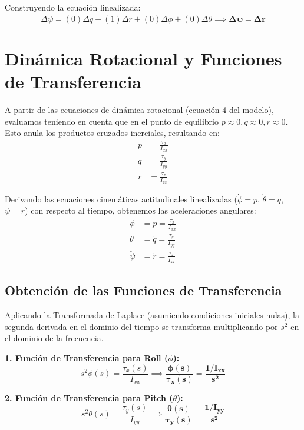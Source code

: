 \documentclass[12pt]{article}
\begin{document}
Construyendo la ecuación linealizada:
\begin{equation}
    \Delta\dot{\psi} = (0)\Delta q + (1)\Delta r + (0)\Delta \phi + (0)\Delta \theta \implies \mathbf{\Delta\dot{\psi} = \Delta r}
\end{equation}

\vspace{0.5cm}

\section{Dinámica Rotacional y Funciones de Transferencia}
A partir de las ecuaciones de dinámica rotacional (ecuación 4 del modelo), evaluamos teniendo en cuenta que en el punto de equilibrio $p \approx 0, q \approx 0, r \approx 0$. Esto anula los productos cruzados inerciales, resultando en:
\begin{align}
    \dot{p} &= \frac{\tau_x}{I_{xx}} \\
    \dot{q} &= \frac{\tau_y}{I_{yy}} \\
    \dot{r} &= \frac{\tau_z}{I_{zz}}
\end{align}

Derivando las ecuaciones cinemáticas actitudinales linealizadas ($\dot{\phi} = p$, $\dot{\theta} = q$, $\dot{\psi} = r$) con respecto al tiempo, obtenemos las aceleraciones angulares:
\begin{align}
    \ddot{\phi} &= \dot{p} = \frac{\tau_x}{I_{xx}} \\
    \ddot{\theta} &= \dot{q} = \frac{\tau_y}{I_{yy}} \\
    \ddot{\psi} &= \dot{r} = \frac{\tau_z}{I_{zz}}
\end{align}

\subsection{Obtención de las Funciones de Transferencia}
Aplicando la Transformada de Laplace (asumiendo condiciones iniciales nulas), la segunda derivada en el dominio del tiempo se transforma multiplicando por $s^2$ en el dominio de la frecuencia. 

\textbf{1. Función de Transferencia para Roll ($\phi$):}
\begin{equation}
    s^2 \phi(s) = \frac{\tau_x(s)}{I_{xx}} \implies \mathbf{\frac{\phi(s)}{\tau_x(s)} = \frac{1/I_{xx}}{s^2}}
\end{equation}

\textbf{2. Función de Transferencia para Pitch ($\theta$):}
\begin{equation}
    s^2 \theta(s) = \frac{\tau_y(s)}{I_{yy}} \implies \mathbf{\frac{\theta(s)}{\tau_y(s)} = \frac{1/I_{yy}}{s^2}}
\end{equation}
\end{document}
